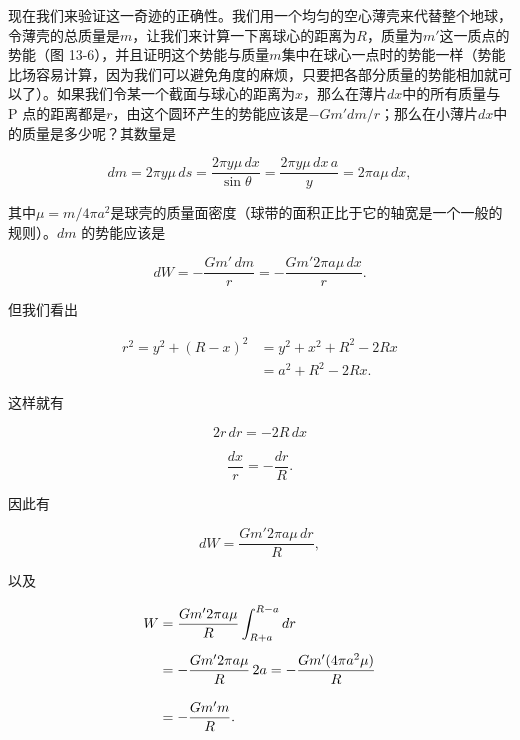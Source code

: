 \documentclass[12pt,oneside]{book}
\begin{document}
现在我们来验证这一奇迹的正确性。我们用一个均匀的空心薄壳来代替整个地球，令薄壳的总质量是$m$，让我们来计算一下离球心的距离为$R$，质量为$m'$这一质点的势能（图 13-6），并且证明这个势能与质量$m$集中在球心一点时的势能一样（势能比场容易计算，因为我们可以避免角度的麻烦，只要把各部分质量的势能相加就可以了）。如果我们令某一个截面与球心的距离为$x$，那么在薄片$dx$中的所有质量与 P 点的距离都是$r$，由这个圆环产生的势能应该是$-Gm'dm/r$；那么在小薄片$dx$中的质量是多少呢？其数量是


\begin{equation*}
dm=2\pi y\mu\,ds=\frac{2\pi y\mu\,dx}{\sin\theta}=
\frac{2\pi y\mu\,dx\,a}{y}=2\pi a\mu\,dx,
\end{equation*}

其中$ \mu=m/4\pi a^2 $是球壳的质量面密度（球带的面积正比于它的轴宽是一个一般的规则）。$ dm $ 的势能应该是

\begin{equation*}
dW=-\frac{Gm'\,dm}{r}=-\frac{Gm'2\pi a\mu\,dx}{r}.
\end{equation*}

但我们看出

\begin{equation*}
\begin{aligned}
r^2=y^2+(R-x)^2&=y^2+x^2+R^2-2Rx\\[.5ex]
&=a^2+R^2-2Rx.
\end{aligned}
\end{equation*}


这样就有

\begin{equation*}
2r\,dr=-2R\,dx
\end{equation*}

\begin{equation*}
\frac{dx}{r}=-\frac{dr}{R}.
\end{equation*}


因此有

\begin{equation*}
dW=\frac{Gm'2\pi a\mu\,dr}{R},
\end{equation*}

以及

\begin{align}
W&=\frac{Gm'2\pi a\mu}{R}\int_{R+a}^{R-a}dr\notag\\[1ex]
&=-\frac{Gm'2\pi a\mu}{R}\,2a=
-\frac{Gm'(4\pi a^2\mu)}{R}\notag\\[2ex]
\label{Eq:I:13:18}
&=-\frac{Gm'm}{R}.
\end{align}
\end{document}
